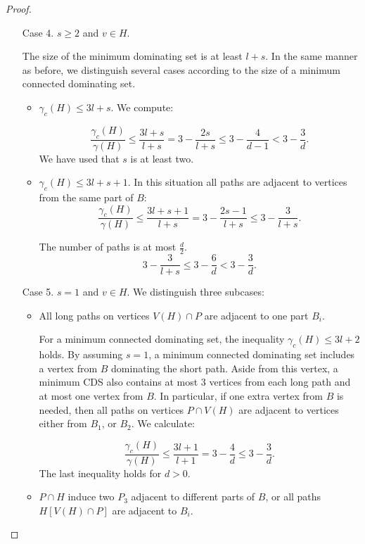 \begin{proof}
\begin{enumerate}
		\item [Case 4.] \(s \geq 2\) and \(v \in H\).
		
		The size of the minimum dominating set is at least \(l + s\).
		In the same manner as before, we distinguish several cases according to the size of a minimum connected dominating set.
			\begin{itemize}
				\item \(\gamma_c(H) \leq {3l + s}\). We compute:

				\[\frac{\gamma_c(H)}{\gamma(H)} \leq {\frac{3l + s}{l + s}} = {3 - \frac{2s}{l + s}} \leq {3 - \frac{4}{d - 1}} < {3 - \frac{3}{d}}.\]
				We have used that \(s\) is at least two.
			
				\item \(\gamma_c(H) \leq {3l + s + 1}\). In this situation all paths are adjacent to vertices from the same part of \(B\):
				\[\frac{\gamma_c(H)}{\gamma(H)} \leq {\frac{3l + s + 1}{l + s}} = {3 - \frac{2s - 1}{l + s}} \leq {3 - \frac{3}{l + s}}.\]

				The number of paths is at most \(\frac{d}{2}\).
				\[{3 - \frac{3}{l + s}} \leq {3 - \frac{6}{d}} < {3 - \frac{3}{d}}.\]
			\end{itemize}

		\item  [Case 5.] \(s = 1\) and \(v \in H\). We distinguish three subcases:
		
			\begin{itemize}
			\item All long paths on vertices \(V(H) \cap P\) are adjacent to one part \(B_i\).
				
			For a minimum connected dominating set, the inequality \(\gamma_c(H) \leq 3l + 2\) holds.
			By assuming \(s = 1\), a minimum connected dominating set includes a vertex from \(B\) dominating the short path. 
			Aside from this vertex, a minimum CDS also contains at most 3 vertices from each long path and at most one vertex from \(B\). 
			In particular, if one extra vertex from \(B\) is needed, then all paths on vertices \(P \cap V(H)\) are adjacent to vertices either from \(B_1\), or \(B_2\).
                        We calculate:

			\[{\frac{\gamma_c(H)}{\gamma(H)}} \leq {\frac{3l + 1}{l + 1}} = {3 - \frac{4}{d}} \leq {3 - \frac{3}{d}}.\]
			The last inequality holds for \(d > 0\).
			
			\item \(P \cap H\) induce two \(P_3\) adjacent to different parts of \(B\), or all paths \(H[V(H) \cap P]\) are adjacent to \(B_i\).
		

\end{itemize}
\end{enumerate}
\end{proof}

